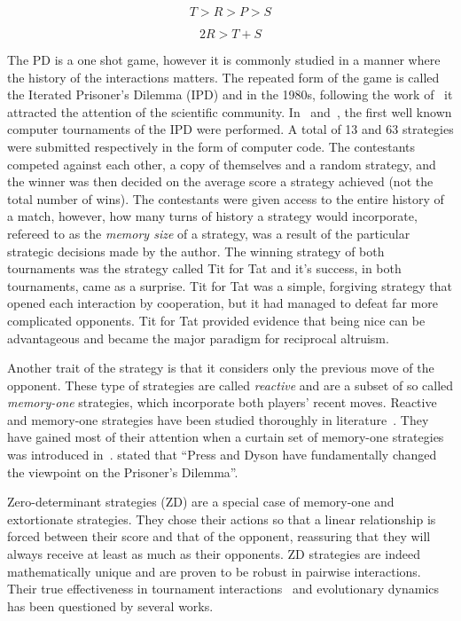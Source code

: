 \documentclass[10pt]{article}
\begin{document}
\begin{equation}\label{eq:pd_constrain_one}
    T > R > P > S
\end{equation}

\begin{equation}\label{eq:pd_constrain_two}
    2R > T + S
\end{equation}

The PD is a one shot game, however it is commonly studied in a manner where the
history of the interactions matters. The repeated form of the game is called the
Iterated Prisoner's Dilemma (IPD) and in the 1980s, following the work
of~\cite{Axelrod1980a, Axelrod1980b} it attracted the attention of the
scientific community. In~\cite{Axelrod1980a} and~\cite{Axelrod1980b}, the first
well known computer tournaments of the IPD were performed. A total of 13 and 63
strategies were submitted respectively in the form of computer code. The
contestants competed against each other, a copy of themselves and a random
strategy, and the winner was then decided on the average score a strategy achieved (not
the total number of wins). The contestants were given access to the entire
history of a match, however, how many turns of history a strategy would
incorporate, refereed to as the \textit{memory size} of a strategy, was a result
of the particular strategic decisions made by the author.
The winning strategy of both tournaments was the strategy called Tit for Tat
and it's success, in both tournaments, came as a surprise. Tit for Tat was a
simple, forgiving strategy that opened each interaction by cooperation,
but it had managed to defeat far more complicated opponents. Tit for Tat provided
evidence that being nice can be advantageous and became the major
paradigm for reciprocal altruism.

Another trait of the strategy is that it considers only the previous
move of the opponent. These type of strategies are called \textit{reactive}
\cite{Nowak1989} and are a subset of so called \textit{memory-one} strategies,
which incorporate both players' recent moves. Reactive and memory-one strategies
have been studied thoroughly in literature~\cite{Nowak1990, Nowak1993}.
They have gained most of their attention when a curtain set of memory-one strategies
was introduced in~\cite{Press2012}. \cite{Stewart2012} stated that ``Press and
Dyson have fundamentally changed the viewpoint on the Prisoner's Dilemma''.

Zero-determinant strategies (ZD) are a special case of memory-one and
extortionate strategies. They chose their actions so that a linear relationship
is forced between their score and that of the opponent, reassuring that they
will always receive at least as much as their opponents. ZD strategies are indeed
mathematically unique and are proven to be robust in pairwise interactions.
Their true effectiveness in tournament interactions~\cite{Harper2015}
and evolutionary dynamics~\cite{Adami2013, Knight2018} has been questioned by
several works.
\end{document}
